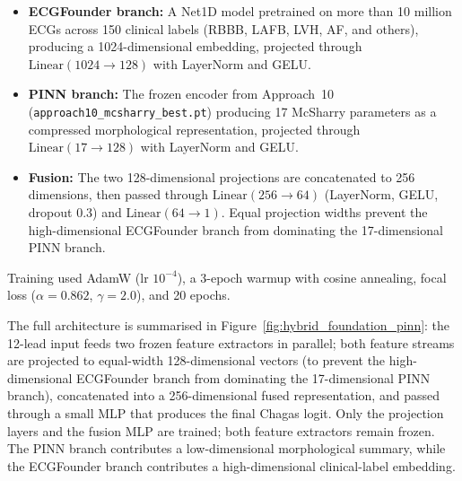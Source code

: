 \begin{itemize}
    \item \textbf{ECGFounder branch:} A Net1D model pretrained on more than 10 million ECGs across 150 clinical labels (RBBB, LAFB, LVH, AF, and others), producing a 1024-dimensional embedding, projected through $\text{Linear}(1024 \to 128)$ with LayerNorm and GELU.
    \item \textbf{PINN branch:} The frozen encoder from Approach~10 (\texttt{approach10\_mcsharry\_best.pt}) producing 17 McSharry parameters as a compressed morphological representation, projected through $\text{Linear}(17 \to 128)$ with LayerNorm and GELU.
    \item \textbf{Fusion:} The two 128-dimensional projections are concatenated to 256 dimensions, then passed through $\text{Linear}(256 \to 64)$ (LayerNorm, GELU, dropout 0.3) and $\text{Linear}(64 \to 1)$. Equal projection widths prevent the high-dimensional ECGFounder branch from dominating the 17-dimensional PINN branch.
\end{itemize}

Training used AdamW (lr $10^{-4}$), a 3-epoch warmup with cosine annealing, focal loss ($\alpha = 0.862$, $\gamma = 2.0$), and 20 epochs.

The full architecture is summarised in
Figure~\ref{fig:hybrid_foundation_pinn}: the 12-lead input feeds
two frozen feature extractors in parallel; both feature streams
are projected to equal-width 128-dimensional vectors (to prevent
the high-dimensional ECGFounder branch from dominating the
17-dimensional PINN branch), concatenated into a 256-dimensional
fused representation, and passed through a small MLP that produces
the final Chagas logit. Only the projection layers and the fusion
MLP are trained; both feature extractors remain frozen. The PINN
branch contributes a low-dimensional morphological summary, while
the ECGFounder branch contributes a high-dimensional
clinical-label embedding.


